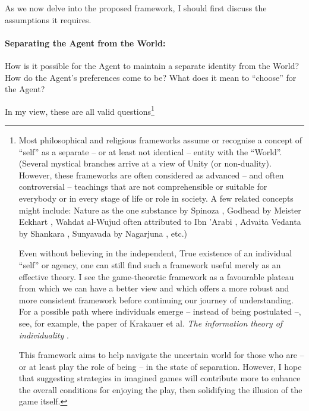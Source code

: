 \documentclass{article}
\begin{document}
As we now delve into the proposed framework, I should first discuss the assumptions it requires.

\paragraph{Separating the Agent from the World:}
How is it possible for the Agent to maintain a separate identity from the World? How do the Agent's preferences come to be? What does it mean to ``choose'' for the Agent?

In my view, these are all valid questions\footnote{
Most philosophical and religious frameworks assume or recognise a concept of ``self'' \cite{sep:Identity,book:WorldsReligions,book:FunfWeltreligionen} as a separate -- or at least not identical -- entity with the ``World''.
(Several mystical branches arrive at a view of Unity (or non-duality). However, these frameworks are often considered as advanced -- and often controversial -- teachings that are not comprehensible or suitable for everybody or in every stage of life or role in society. A few related concepts might include: Nature as the one substance by Spinoza \cite{book:SpinozaEthics, sep:SpinozaPhysics}, Godhead by Meister Eckhart \cite{book:RoyceEckhart,sep:Eckhart,book:Eckhart}, Wahdat al-Wujud often attributed to Ibn 'Arabi \cite{sep:IbnArabi,book:HistoryOfIslamicPhilosophy,book:IbnArabi}, Advaita Vedanta by Shankara \cite{sep:Shankara,book:AdvaitaVedanta}, Sunyavada by Nagarjuna \cite{sep:Nagarjuna,book:Nagarjuna}, etc.)

Even without believing in the independent, True existence of an individual ``self'' or agency, one can still find such a framework useful merely as an effective theory.
I see the game-theoretic framework as a favourable plateau from which we can have a better view and which offers a more robust and more consistent framework before continuing our journey of understanding.
For a possible path where individuals emerge -- instead of being postulated --, see, for example, the paper of Krakauer et al. \emph{The information theory of individuality}  \cite{paper:Individuality}.

This framework aims to help navigate the uncertain world for those who are -- or at least play the role of being -- in the state of separation. However, I hope that suggesting strategies in imagined games will contribute more to enhance the overall conditions for enjoying the play, then solidifying the illusion of the game itself.

}
\end{document}
